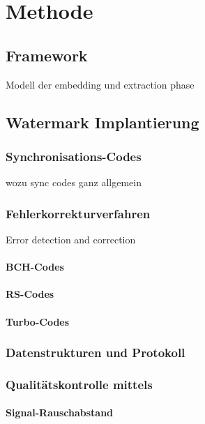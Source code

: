 \chapter{Methode}
\label{ch:methode}

\section{Framework}

Modell der embedding und extraction phase

\section{Watermark Implantierung}

\subsection{Synchronisations-Codes}

wozu sync codes ganz allgemein

\subsection{Fehlerkorrekturverfahren}

Error detection and correction

\subsubsection{BCH-Codes}

\subsubsection{RS-Codes}

\subsubsection{Turbo-Codes}

\subsection{Datenstrukturen und Protokoll}

\subsection{Qualitätskontrolle mittels }

\subsubsection{Signal-Rauschabstand}

